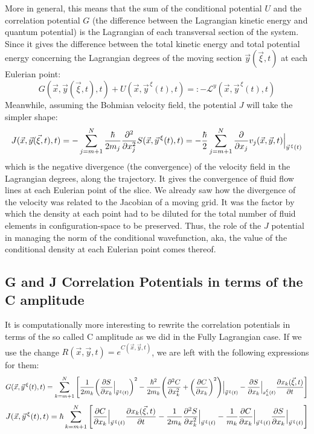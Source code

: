 \documentclass[11pt, a4paper]{article} %
\newcommand{\Lg}{\mathscr{L}}
\begin{document}
More in general, this means that the sum of the conditional potential $U$ and the correlation potential $G$ (the difference between the Lagrangian kinetic energy and quantum potential) is the Lagrangian of each transversal section of the system. Since it gives the difference between the total kinetic energy and total potential energy concerning the Lagrangian degrees of the moving section $\vec{y}(\vec{\xi},t)$ at each Eulerian point:
\begin{equation}
G(\vec{x},\vec{y}(\vec{\xi},t),t)+U(\vec{x},\vec{y}^{\, \xi}(t),t)=:-\Lg^y(\vec{x},\vec{y}^{\, \xi}(t),t)
\end{equation}
Meanwhile, assuming the Bohmian velocity field, the potential $J$ will take the simpler shape:
\begin{equation}\label{J.Bohm}
J(\vec{x},\vec{y}(\vec{\xi},t),t)=-\sum_{j=m+1}^N\frac{\hbar}{2m_j}\pdv[2]{}{x_j}S(\vec{x},\vec{y}^{\, \xi}(t),t)=-\frac{\hbar}{2}\sum_{j=m+1}^N\pdv{}{x_j}v_j(\vec{x},\vec{y},t)\Big\rvert_{\vec{y}^{\, \xi}(t)}
\end{equation}
which is the negative divergence (the convergence) of the velocity field in the Lagrangian degrees, along the trajectory. It gives the convergence of fluid flow lines at each Eulerian point of the slice. We already saw how the divergence of the velocity was related to the Jacobian of a moving grid. It was the factor by which the density at each point had to be diluted for the total number of fluid elements in configuration-space to be preserved. Thus, the role of the $J$ potential in managing the norm of the conditional wavefunction, aka, the value of the conditional density at each Eulerian point comes thereof.\vspace{-0.2cm}
\subsection*{G and J Correlation Potentials in terms of the C amplitude\vspace{-0.1cm}}
It is computationally more interesting to rewrite the correlation potentials in terms of the so called C amplitude as we did in the Fully Lagrangian case. If we use the change $R(\vec{x},\vec{y},t)=e^{C(\vec{x},\vec{y},t)}$, we are left with the following expressions for them:
\begin{equation}
G(\vec{x}, \vec{y}^{\, \xi}(t),t)=  \sum_{k=m+1}^N \qty[\frac{1}{2m_k} \qty(\pdv{S}{x_k}\Big\rvert_{\vec{y}^{\, \xi}(t)})^2 -\frac{\hbar^2}{2m_k}\qty(\pdv[2]{C}{x_k}+\qty(\pdv{C}{x_k})^2)\Big\rvert_{\vec{y}^{\, \xi}(t)} -\pdv{S}{x_k}\Big\rvert_{x_k^\xi(t)} \pdv{x_k(\vec{\xi},t)}{t} ]
\end{equation}
\begin{equation}
J(\vec{x}, \vec{y}^{\, \xi}(t),t)= \hbar\sum_{k=m+1}^N \qty[ \pdv{C}{x_k}\Big\rvert_{\vec{y}^{\, \xi}(t)} \pdv{x_k(\vec{\xi},t)}{t} - \frac{1}{2m_k} \pdv[2]{S}{x_k}\Big\rvert_{\vec{y}^{\, \xi}(t)}-\frac{1}{m_k}\pdv{C}{x_k}\Big\rvert_{\vec{y}^{\, \xi}(t)}  \pdv{S}{x_k} \Big\rvert_{\vec{y}^{\, \xi}(t)} ]
\end{equation}
\end{document}
